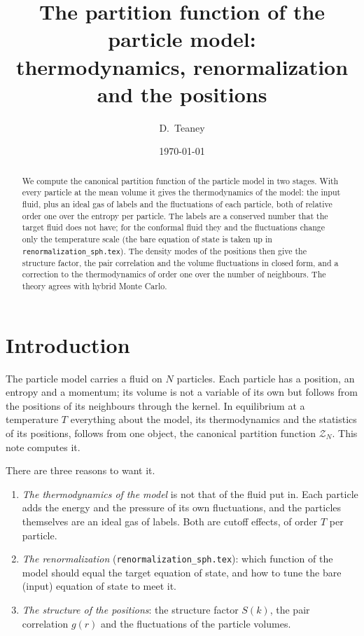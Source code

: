 \documentclass[11pt,aps,preprint,nofootinbib,superscriptaddress,tightenlines]{revtex4-2}
\begin{document}
\title{The partition function of the particle model:\\ thermodynamics, renormalization and the positions}
\author{D.~Teaney}
\date{\today}

\begin{abstract}
We compute the canonical partition function of the particle model in two stages.  With every particle at the mean volume it gives the
thermodynamics of the model: the input fluid, plus an ideal gas of labels and the fluctuations of each particle, both of relative order one over
the entropy per particle.  The labels are a conserved number that the target fluid does not have; for the conformal fluid they and the fluctuations
change only the temperature scale (the bare equation of state is taken up in \nolinkurl{renormalization_sph.tex}).  The density modes of the positions then give the structure factor, the pair correlation and the volume
fluctuations in closed form, and a correction to the thermodynamics of order one over the number of neighbours.  The theory agrees with hybrid Monte Carlo.
\end{abstract}

\maketitle
\tableofcontents

\section{Introduction}
\label{sec:intro}

The particle model carries a fluid on $N$ particles.  Each particle has a position, an entropy and a momentum; its volume is not a variable of its own
but follows from the positions of its neighbours through the kernel.  In equilibrium at a temperature $T$ everything about the model, its
thermodynamics and the statistics of its positions, follows from one object, the canonical partition function $\mathcal Z_N$.  This note computes it.

There are three reasons to want it.
\begin{enumerate}
\item \emph{The thermodynamics of the model} is not that of the fluid put in.  Each particle adds the energy and the pressure of its own fluctuations,
  and the particles themselves are an ideal gas of labels.  Both are cutoff effects, of order $T$ per particle.
\item \emph{The renormalization} (\nolinkurl{renormalization_sph.tex}): which function of the model should equal the target equation of state, and how to tune the bare (input)
  equation of state to meet it.
\item \emph{The structure of the positions}: the structure factor $S(k)$, the pair correlation $g(r)$ and the fluctuations of the particle volumes.
\end{enumerate}
\end{document}
